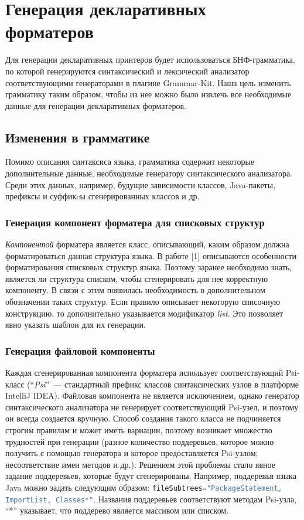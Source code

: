 \documentclass[conference]{IEEEtran}
\begin{document}
\section{Генерация декларативных форматеров}
Для генерации декларативных принтеров будет использоваться БНФ-грамматика, по которой генерируются синтаксический и лексический анализатор соответствующими генераторами в плагине Grammar-Kit.
Наша цель изменить грамматику таким образом, чтобы из нее можно было извлечь все необходимые данные для генерации декларативных форматеров.
\subsection{Изменения в грамматике}
Помимо описания синтаксиса языка, грамматика содержит некоторые дополнительные данные, необходимые генератору синтаксического анализатора.
Среди этих данных, например, будущие зависимости классов, Java-пакеты, префиксы и суффикcы сгенерированных классов и др.

\subsubsection*{Генерация компонент форматера для списковых структур}
\emph{Компонентой} форматера является класс, описывающий, каким образом должна форматироваться данная структура языка.
В работе [1] %
описываются особенности форматирования списковых структур языка.
Поэтому заранее необходимо знать, является ли структура списком, чтобы сгенерировать для нее корректную компоненту.
В связи с этим появилась необходимость в дополнительном обозначении таких структур.
Если правило описывает некоторую списочную конструкцию, то дополнительно указывается модификатор \emph{list}.
Это позволяет явно указать шаблон для их генерации.

\subsubsection*{Генерация файловой компоненты}
Каждая сгенерированная компонента форматера использует соответствующий Psi-класс (``\emph{Psi}''~--- стандартный префикс классов синтаксических узлов в платформе IntelliJ IDEA).
Файловая компонента не является исключением, однако генератор синтаксического анализатора не генерирует соответствующий Psi-узел, и поэтому он всегда создается вручную.
Способ создания такого класса не подчиняется строгим правилам и может иметь вариации, поэтому возникает множество трудностей при генерации (разное количество поддеревьев, которое можно получить с помощью генератора и которое предоставляется Psi-узлом; несоответствие имен методов и др.).
Решением этой проблемы стало явное задание поддеревьев, которые будут сгенерированы.
Например, поддеревья языка Java можно задать следующим образом: \lstinline[language=java]{fileSubtrees="PackageStatement, ImportList, Classes*"}.
Названия поддеревьев соответствуют методам Psi-узла, ``*'' указывает, что поддерево является массивом или списком.
\end{document}

